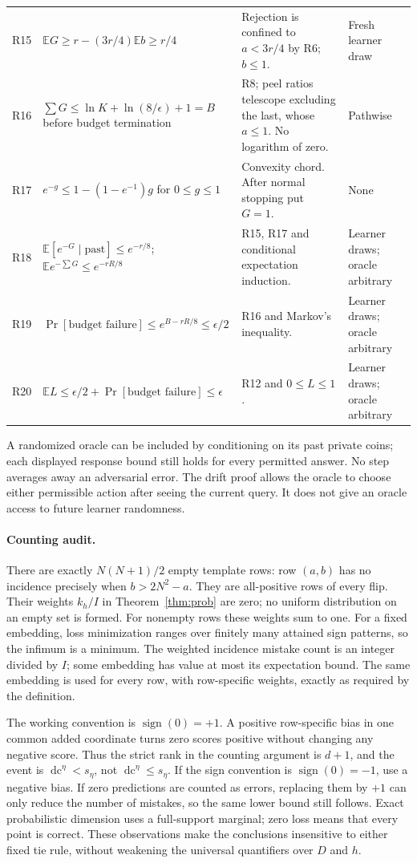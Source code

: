 \documentclass[11pt]{article}
\DeclareMathOperator{\dc}{dc}
\DeclareMathOperator{\sign}{sign}
\newcommand{\E}{\mathbb E}
\newcommand{\1}{\mathbf 1}
\begin{document}
\begin{longtable}{@{}p{.6cm}p{6.2cm}p{4.9cm}>{\raggedright\arraybackslash}p{2.4cm}@{}}
R15 & $\E G\ge r-(3r/4)\E b\ge r/4$ & Rejection is confined to $a<3r/4$ by R6; $b\le1$. & Fresh learner draw\\
R16 & $\sum G\le\ln K+\ln(8/\epsilon)+1=B$ before budget termination & R8; peel ratios telescope excluding the last, whose $a\le1$. No logarithm of zero. & Pathwise\\
R17 & $e^{-g}\le1-(1-e^{-1})g$ for $0\le g\le1$ & Convexity chord. After normal stopping put $G=1$. & None\\
R18 & $\E[e^{-G}\mid\text{past}]\le e^{-r/8}$; $\E e^{-\sum G}\le e^{-rR/8}$ & R15, R17 and conditional expectation induction. & Learner draws; oracle arbitrary\\
R19 & $\Pr[\text{budget failure}]\le e^{B-rR/8}\le\epsilon/2$ & R16 and Markov's inequality. & Learner draws; oracle arbitrary\\
R20 & $\E L\le\epsilon/2+\Pr[\text{budget failure}]\le\epsilon$ & R12 and $0\le L\le1$. & Learner draws; oracle arbitrary\\
\bottomrule
\end{longtable}
\normalsize

A randomized oracle can be included by conditioning on its past private coins; each displayed response bound still holds for every permitted answer. No step averages away an adversarial error. The drift proof allows the oracle to choose either permissible action after seeing the current query. It does not give an oracle access to future learner randomness.

\paragraph{Counting audit.}
There are exactly $N(N+1)/2$ empty template rows: row $(a,b)$ has no incidence precisely when $b>2N^2-a$. They are all-positive rows of every flip. Their weights $k_h/I$ in Theorem~\ref{thm:prob} are zero; no uniform distribution on an empty set is formed. For nonempty rows these weights sum to one. For a fixed embedding, loss minimization ranges over finitely many attained sign patterns, so the infimum is a minimum. The weighted incidence mistake count is an integer divided by $I$; some embedding has value at most its expectation bound. The same embedding is used for every row, with row-specific weights, exactly as required by the definition.

The working convention is $\sign(0)=+1$. A positive row-specific bias in one common added coordinate turns zero scores positive without changing any negative score. Thus the strict rank in the counting argument is $d+1$, and the event is $\dc^\eta<s_\eta$, not $\dc^\eta\le s_\eta$. If the sign convention is $\sign(0)=-1$, use a negative bias. If zero predictions are counted as errors, replacing them by $+1$ can only reduce the number of mistakes, so the same lower bound still follows. Exact probabilistic dimension uses a full-support marginal; zero loss means that every point is correct. These observations make the conclusions insensitive to either fixed tie rule, without weakening the universal quantifiers over $D$ and $h$.
\end{document}
